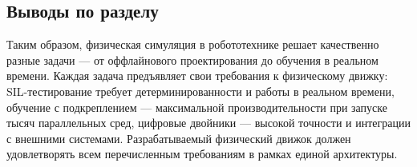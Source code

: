 \subsection{Выводы по разделу}

Таким образом, физическая симуляция в робототехнике решает качественно разные задачи --- от оффлайнового 
проектирования до обучения в реальном времени. Каждая задача предъявляет свои требования к физическому движку: 
SIL-тестирование требует детерминированности и работы в реальном времени, обучение с подкреплением --- 
максимальной производительности при запуске тысяч параллельных сред, цифровые двойники --- высокой точности и 
интеграции с внешними системами. Разрабатываемый физический движок должен удовлетворять всем перечисленным 
требованиям в рамках единой архитектуры.
